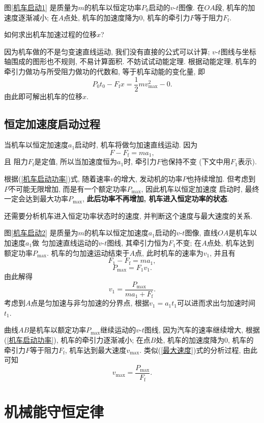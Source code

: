 \documentclass[11pt,a4paper]{ctexbook}
\begin{document}
图\ref{机车启动1} 是质量为$m$的机车以恒定功率$P_0$启动的$v$-$t$图像. 在$OA$段, 机车的加速度逐渐减小;
在$A$点处, 机车的加速度降为0, 机车的牵引力$F$等于阻力$F_\mathrm{f}$.

{\kaishu 如何求出机车加速过程的位移$x$? }

因为机车做的不是匀变速直线运动, 我们没有直接的公式可以计算;
$v$-$t$图线与坐标轴围成的图形也不规则, 不易计算面积. 不妨试试动能定理.
根据动能定理, 机车的牵引力做功与所受阻力做功的代数和, 等于机车动能的变化量, 即
$$P_0t_0 - F_\mathrm{f}x = \frac12 m v_\mathrm{max}^2 - 0.$$
由此即可解出机车的位移$x$.

\subsection*{恒定加速度启动过程}

当机车以恒定加速度$a_1$启动时, 机车将做匀加速直线运动. 因为 $$F - F_\mathrm{f} = ma_1, $$ 且
阻力$F_\mathrm{f}$是定值, 所以当加速度恒为$a_1$时, 牵引力$F$也保持不变 (下文中用$F_1$表示).

根据(\ref{机车启动功率})式, 随着速率$v$的增大, 发动机的功率$P$也持续增加. 但考虑到
$P$不可能无限增加, 而是有一个额定功率$P_\mathrm{max}$, 因此机车以恒定加速度
启动时, 最终一定会达到最大功率$P_\mathrm{max}$, \textbf{此后功率不再增加, 机车进入恒定功率的状态}.

{\kaishu 还需要分析机车进入恒定功率状态时的速度, 并判断这个速度与最大速度的关系.}

图\ref{机车启动2} 是质量为$m$的机车以恒定加速度$a_1$启动的$v$-$t$图像, 直线$OA$是机车以加速度$a_1$做
匀加速直线运动的$v$-$t$图线, 其牵引力恒为$F_1$不变; 在$A$点处, 机车达到额定功率$P_\mathrm{max}$.
机车的匀加速运动结束于$A$点, 此时机车的速率为$v_1$, 并且有
$$F_1 - F_\mathrm{f} = ma_1,$$ $$P_\mathrm{max} = F_1v_1.$$
由此解得$$v_1 = \frac{P_\mathrm{max}}{ma_1+F_\mathrm{f}}.$$
考虑到$A$点是匀加速与非匀加速的分界点, 根据$v_1 = a_1t_1$可以进而求出匀加速时间$t_1$.

曲线$AB$是机车以额定功率$P_\mathrm{max}$继续运动的$v$-$t$图线, 因为汽车的速率继续增大, 根据(\ref{机车启动功率}),
机车的牵引力逐渐减小; 在点$B$处, 机车的加速度降为0, 机车的牵引力$F$等于阻力$F_\mathrm{f}$,
机车达到最大速度$v_\mathrm{max}$. 类似(\ref{最大速度})式的分析过程, 由此可知$$v_\mathrm{max} = \frac{P_\mathrm{max}}{F_\mathrm{f}}.$$

\section{机械能守恒定律}
\end{document}
